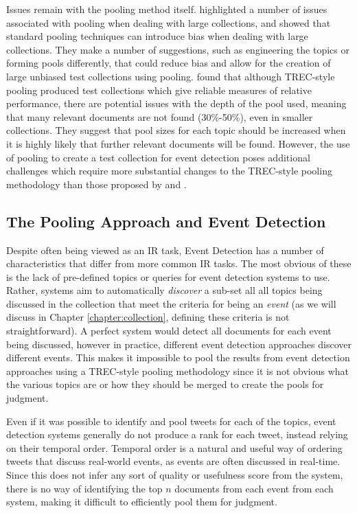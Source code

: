 Issues remain with the pooling method itself.
\cite{Buckley:2007:BLP:1298708.1298735} highlighted a number of issues associated with pooling when dealing with large collections, and showed that standard pooling techniques can introduce bias when dealing with large collections.
They make a number of suggestions, such as engineering the topics or forming pools differently, that could reduce bias and allow for the creation of large unbiased test collections using pooling.
\cite{Zobel:1998:RRL:290941.291014} found that although TREC-style pooling produced test collections which give reliable measures of relative performance, there are potential issues with the depth of the pool used, meaning that many relevant documents are not found (30\%-50\%), even in smaller collections.
They suggest that pool sizes for each topic should be increased when it is highly likely that further relevant documents will be found.
However, the use of pooling to create a test collection for event detection poses additional challenges which require more substantial changes to the TREC-style pooling methodology than those proposed by \cite{Buckley:2007:BLP:1298708.1298735} and \cite{Zobel:1998:RRL:290941.291014}.

\subsection{The Pooling Approach and Event Detection}
Despite often being viewed as an IR task, Event Detection has a number of characteristics that differ from more common IR tasks.
The most obvious of these is the lack of pre-defined topics or queries for event detection systems to use.
Rather, systems aim to automatically \emph{discover} a sub-set all all topics being discussed in the collection that meet the criteria for being an \emph{event} (as we will discuss in Chapter \ref{chapter:collection}, defining these criteria is not straightforward).
A perfect system would detect all documents for each event being discussed, however in practice, different event detection approaches discover different events.
This makes it impossible to pool the results from event detection approaches using a TREC-style pooling methodology since it is not obvious what the various topics are or how they should be merged to create the pools for judgment.

Even if it was possible to identify and pool tweets for each of the topics, event detection systems generally do not produce a rank for each tweet, instead relying on their temporal order.
Temporal order is a natural and useful way of ordering tweets that discuss real-world events, as events are often discussed in real-time.
Since this does not infer any sort of quality or usefulness score from the system, there is no way of identifying the top $n$ documents from each event from each system, making it difficult to efficiently pool them for judgment.

